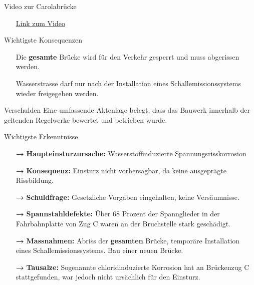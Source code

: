 \begin{frame}{Video zur Carolabrücke}
    \begin{block}{}
        \begin{itemize}
            \item[\textbullet] \href{https://www.youtube.com/watch?v=5J9Z1K1Z9f4}{Link zum Video}
        \end{itemize}
    \end{block}

\end{frame}

\begin{frame}{Wichtigste Konsequenzen}
    \begin{block}{}
        \begin{itemize}
            \item[\textbullet] Die \textbf{gesamte }Brücke wird für den Verkehr gesperrt und muss abgerissen werden.
            \item[\textbullet] Wasserstrasse darf nur nach der Installation eines Schallemissionssystems wieder freigegeben werden.
        \end{itemize}
    \end{block}
    \pause
    \begin{block}{Verschulden}
        Eine umfassende Aktenlage belegt, dass
        das Bauwerk innerhalb der geltenden Regelwerke bewertet und betrieben wurde.
    \end{block}
\end{frame}

\begin{frame}{Wichtigste Erkenntnisse}
    \begin{itemize}
        \item [\textbf{→}] \textbf{Haupteinsturzursache:} Wasserstoffinduzierte Spannungsrisskorrosion
        \item [\textbf{→}] \textbf{Konsequenz:} Einsturz nicht vorhersagbar, da keine ausgeprägte Rissbildung.
        \item [\textbf{→}] \textbf{Schuldfrage:} Gesetzliche Vorgaben eingehalten, keine Versäumnisse.
        \item [\textbf{→}] \textbf{Spannstahldefekte:} Über 68 Prozent der Spannglieder in der Fahrbahnplatte von Zug C waren an der Bruchstelle stark geschädigt. 
        \item [\textbf{→}] \textbf{Massnahmen:} Abriss der \textbf{gesamten} Brücke, temporäre Installation eines Schallemissionssystems. Bau einer neuen Brücke.
        \item [\textbf{→}] \textbf{Tausalze:} Sogenannte chloridinduzierte Korrosion hat an Brückenzug C stattgefunden, war jedoch nicht ursächlich für den Einsturz. 
    \end{itemize}
\end{frame}

